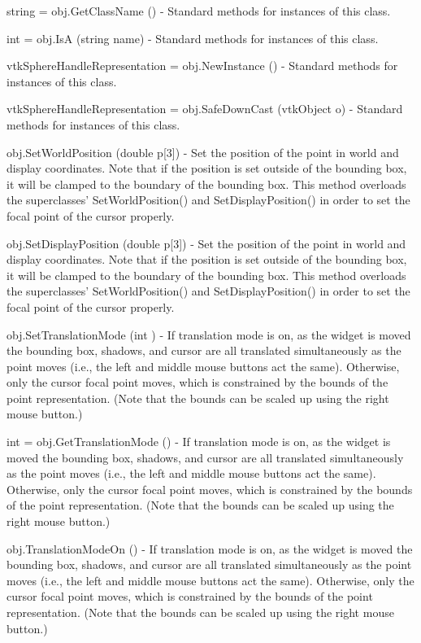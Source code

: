 \begin{DoxyItemize}
\item {\ttfamily string = obj.\-Get\-Class\-Name ()} -\/ Standard methods for instances of this class.  
\item {\ttfamily int = obj.\-Is\-A (string name)} -\/ Standard methods for instances of this class.  
\item {\ttfamily vtk\-Sphere\-Handle\-Representation = obj.\-New\-Instance ()} -\/ Standard methods for instances of this class.  
\item {\ttfamily vtk\-Sphere\-Handle\-Representation = obj.\-Safe\-Down\-Cast (vtk\-Object o)} -\/ Standard methods for instances of this class.  
\item {\ttfamily obj.\-Set\-World\-Position (double p\mbox{[}3\mbox{]})} -\/ Set the position of the point in world and display coordinates. Note that if the position is set outside of the bounding box, it will be clamped to the boundary of the bounding box. This method overloads the superclasses' Set\-World\-Position() and Set\-Display\-Position() in order to set the focal point of the cursor properly.  
\item {\ttfamily obj.\-Set\-Display\-Position (double p\mbox{[}3\mbox{]})} -\/ Set the position of the point in world and display coordinates. Note that if the position is set outside of the bounding box, it will be clamped to the boundary of the bounding box. This method overloads the superclasses' Set\-World\-Position() and Set\-Display\-Position() in order to set the focal point of the cursor properly.  
\item {\ttfamily obj.\-Set\-Translation\-Mode (int )} -\/ If translation mode is on, as the widget is moved the bounding box, shadows, and cursor are all translated simultaneously as the point moves (i.\-e., the left and middle mouse buttons act the same). Otherwise, only the cursor focal point moves, which is constrained by the bounds of the point representation. (Note that the bounds can be scaled up using the right mouse button.)  
\item {\ttfamily int = obj.\-Get\-Translation\-Mode ()} -\/ If translation mode is on, as the widget is moved the bounding box, shadows, and cursor are all translated simultaneously as the point moves (i.\-e., the left and middle mouse buttons act the same). Otherwise, only the cursor focal point moves, which is constrained by the bounds of the point representation. (Note that the bounds can be scaled up using the right mouse button.)  
\item {\ttfamily obj.\-Translation\-Mode\-On ()} -\/ If translation mode is on, as the widget is moved the bounding box, shadows, and cursor are all translated simultaneously as the point moves (i.\-e., the left and middle mouse buttons act the same). Otherwise, only the cursor focal point moves, which is constrained by the bounds of the point representation. (Note that the bounds can be scaled up using the right mouse button.)  

\end{DoxyItemize}
